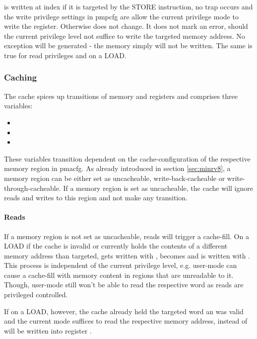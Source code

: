  is written at index  if it is targeted by the STORE instruction, no trap occurs and the write privilege settings in \gls{pmpcfg} are allow the current privilege mode to write the register.
Otherwise  does not change.
It does not mark an error, should the current privilege level not suffice to write the targeted memory address.
No exception will be generated - the memory simply will not be written.
The same is true for read privileges and  on a LOAD.

\subsubsection{Caching}

The cache spices up transitions of memory and registers and comprises three variables:
\begin{itemize}
    \item {}
    \item {}
    \item {}
\end{itemize}

These variables transition dependent on the cache-configuration of the respective memory region in \gls{pmacfg}.
As already introduced in section \ref{sec:minrv8}, a memory region can be either set as uncacheable, write-back-cacheable or write-through-cacheable.
If a memory region is set as uncacheable, the cache will ignore reads and writes to this region and not make any transition.

\paragraph{Reads}
If a memory region is not set as uncacheable, reads will trigger a cache-fill.
On a LOAD if the cache is invalid or currently holds the contents of a different memory address than targeted,  gets written with ,  becomes  and  is written with .
This process is independent of the current privilege level, e.g. user-mode can cause a cache-fill with memory content in regions that are unreadable to it.
Though, user-mode still won't be able to read the respective word as reads are privileged controlled.

If on a LOAD, however, the cache already held the targeted word an was valid and the current mode suffices to read the respective memory address,  instead of  will be written into register .

